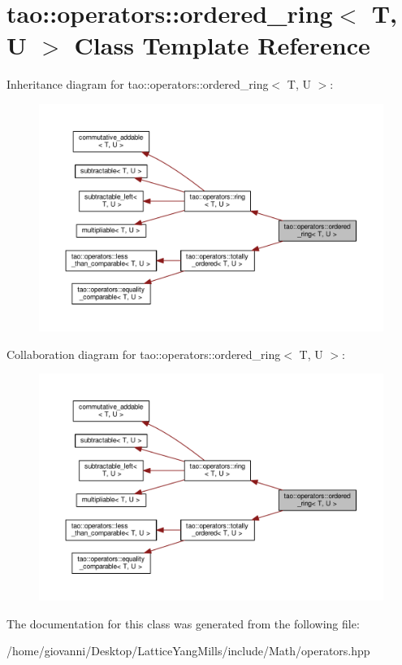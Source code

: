 \hypertarget{classtao_1_1operators_1_1ordered__ring}{}\section{tao\+:\+:operators\+:\+:ordered\+\_\+ring$<$ T, U $>$ Class Template Reference}
\label{classtao_1_1operators_1_1ordered__ring}


Inheritance diagram for tao\+:\+:operators\+:\+:ordered\+\_\+ring$<$ T, U $>$\+:\nopagebreak
\begin{figure}[H]
\begin{center}
\leavevmode
\includegraphics[width=350pt]{classtao_1_1operators_1_1ordered__ring__inherit__graph}
\end{center}
\end{figure}


Collaboration diagram for tao\+:\+:operators\+:\+:ordered\+\_\+ring$<$ T, U $>$\+:\nopagebreak
\begin{figure}[H]
\begin{center}
\leavevmode
\includegraphics[width=350pt]{classtao_1_1operators_1_1ordered__ring__coll__graph}
\end{center}
\end{figure}


The documentation for this class was generated from the following file\+:\begin{DoxyCompactItemize}
\item 
/home/giovanni/\+Desktop/\+Lattice\+Yang\+Mills/include/\+Math/operators.\+hpp\end{DoxyCompactItemize}
